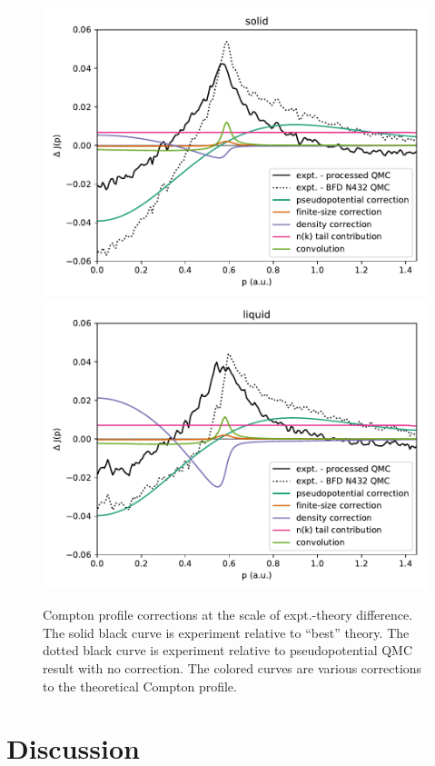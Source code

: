 \documentclass[aps,prb,showpacs,preprintnumbers,amsmath,amssymb,superscriptaddress,twocolumn]{revtex4-1}
\begin{document}
\begin{figure}
\includegraphics[width=\linewidth]{li58_solid-the-djp}
\includegraphics[width=\linewidth]{li58_liquid-the-djp}
\caption{Compton profile corrections at the scale of expt.-theory difference. The solid black curve is experiment relative to ``best'' theory. The dotted black curve is experiment relative to pseudopotential QMC result with no correction. The colored curves are various corrections to the theoretical Compton profile. \label{fig:sl-corrections}}
\end{figure}

\section{Discussion} \label{sec:discussion}
\end{document}
